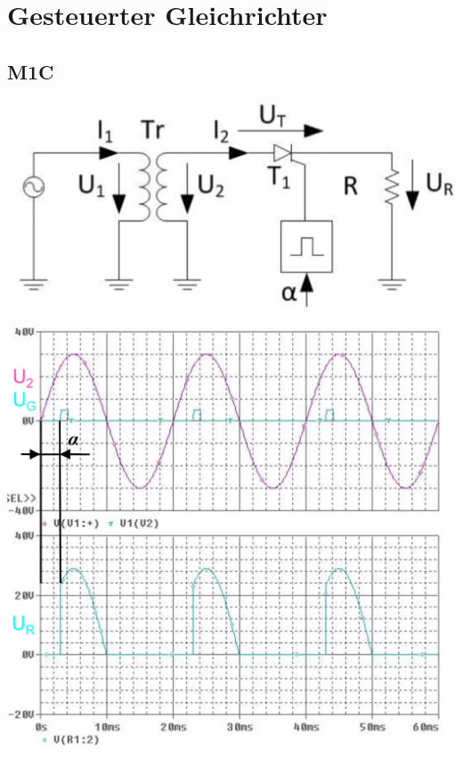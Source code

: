 \section{Gesteuerter Gleichrichter}
\subsection{M1C}
\vspace{-1cm}
\begin{minipage}{0.4\linewidth}
    \includegraphics[width=0.8\linewidth]{images/GRM1c}
\end{minipage}
\begin{minipage}{0.35\linewidth}
    \centering %
    \includegraphics[width=0.8\linewidth]{images/M1CKl}

\end{minipage}
